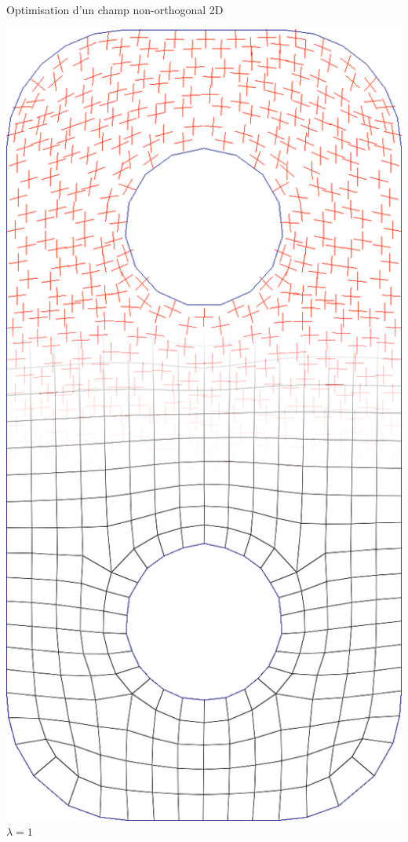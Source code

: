 \begin{frame}{Optimisation d'un champ non-orthogonal 2D}
\begin{minipage}[b]{0.15\textwidth}
        \centering
        \includegraphics[width=\textwidth]{img_spm_ff/perced_16}
        $\lambda = 1$
    \end{minipage}
    \ \ \ 
    \begin{minipage}[b]{0.15\textwidth}

\end{minipage}
\end{frame}

